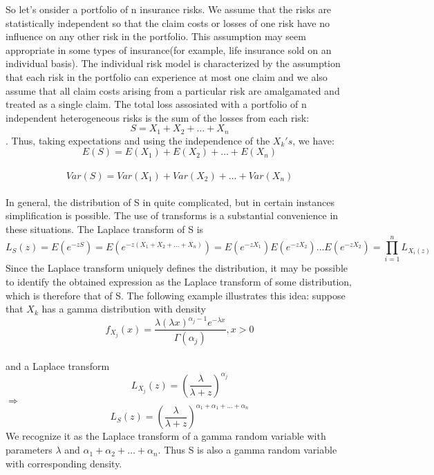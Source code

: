 \documentclass[12pt]{article}
\begin{document}
So let's onsider a portfolio of n insurance risks. We assume that the risks are statistically independent so that the claim costs or losses of one risk have no influence on any other risk in the portfolio. This assumption may seem appropriate in some types of insurance(for example, life insurance sold on an individual basis). The individual risk model is characterized by the assumption that each risk in the portfolio can experience at most one claim and we also assume that all claim costs arising from a particular risk are amalgamated and treated as a single claim. The total loss assosiated with a portfolio of n independent heterogeneous risks is the sum of the losses from each risk:  
$$ S= X_1 + X_2 +\dots+ X_n$$. 
Thus, taking expectations and using the independence of the $X_k's$, we have:\\
 $$ E(S)= E(X_1) + E(X_2) +\dots+ E(X_n)$$\\
 $$ Var(S)= Var(X_1) + Var(X_2) +\dots+ Var(X_n)$$\\
 
 In general, the distribution of S in quite complicated, but in certain instances simplification is possible. The use of transforms is a substantial convenience in these situations. The Laplace transform of S is\\
$$L_S(z)=E(e^{-zS})=E(e^{-z(X_1 + X_2+\dots +X_n)})=E(e^{-zX_1})E(e^{-zX_2}) \dots E(e^{-zX_2})=\prod\limits_{i = 1}^n  L_{X_i(z)}$$
 Since the Laplace transform uniquely defines the distribution, it may be possible to identify the obtained expression as the Laplace transform of some distribution, which is therefore that of S. The following example illustrates this idea: suppose that $X_k$ has a gamma distribution with density 
 $$f_{X_j}(x)=\frac {\lambda(\lambda x)^{\alpha_j -1} e^{- \lambda x} } {\Gamma(\alpha_j)}, x >0$$\\
 and a Laplace transform $$L_{X_j}(z) = (\frac {\lambda} {\lambda + z } )^{\alpha_j}$$
 $\Rightarrow $ $$L_S(z) = (\frac {\lambda} {\lambda + z } )^{\alpha_1 + \alpha_1 +\dots + \alpha_n }$$
 We recognize it as the Laplace transform of a gamma random variable with parameters $\lambda$ and  
 $\alpha_1 + \alpha_2 +\dots + \alpha_n.$ Thus S is also a gamma random variable with corresponding density.\\
\end{document}
